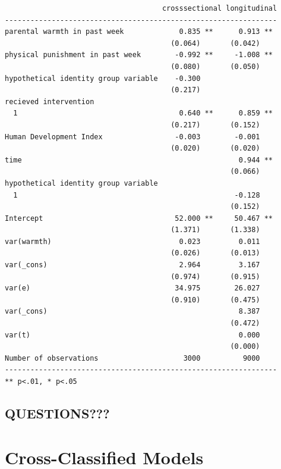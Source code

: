 \documentclass[
  letterpaper,
  DIV=11,
  numbers=noendperiod]{scrreprt}
\begin{document}
\begin{verbatim}
                                     crosssectional longitudinal
----------------------------------------------------------------
parental warmth in past week             0.835 **      0.913 ** 
                                       (0.064)       (0.042)    
physical punishment in past week        -0.992 **     -1.008 ** 
                                       (0.080)       (0.050)    
hypothetical identity group variable    -0.300                  
                                       (0.217)                  
recieved intervention                                           
  1                                      0.640 **      0.859 ** 
                                       (0.217)       (0.152)    
Human Development Index                 -0.003        -0.001    
                                       (0.020)       (0.020)    
time                                                   0.944 ** 
                                                     (0.066)    
hypothetical identity group variable                            
  1                                                   -0.128    
                                                     (0.152)    
Intercept                               52.000 **     50.467 ** 
                                       (1.371)       (1.338)    
var(warmth)                              0.023         0.011    
                                       (0.026)       (0.013)    
var(_cons)                               2.964         3.167    
                                       (0.974)       (0.915)    
var(e)                                  34.975        26.027    
                                       (0.910)       (0.475)    
var(_cons)                                             8.387    
                                                     (0.472)    
var(t)                                                 0.000    
                                                     (0.000)    
Number of observations                    3000          9000    
----------------------------------------------------------------
** p<.01, * p<.05
\end{verbatim}

\section{QUESTIONS???}\label{majorsection}


\chapter{Cross-Classified Models}\label{cross-classified-models}
\end{document}
